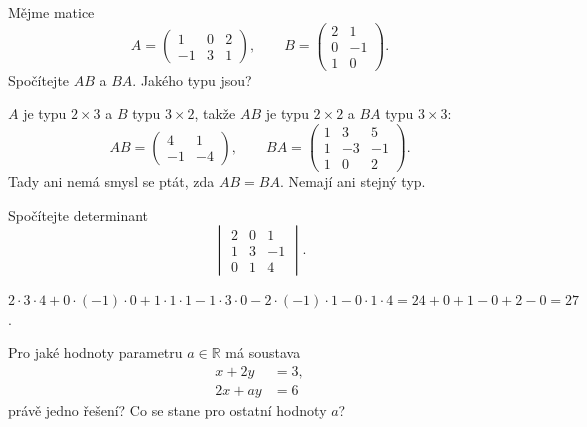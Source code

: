 \begin{problem}
  Mějme matice
  \begin{equation*}
    A = \begin{pmatrix} 1 & 0 & 2\\ -1 & 3 & 1 \end{pmatrix},\qquad B = \begin{pmatrix} 2 & 1\\ 0 & -1\\ 1 & 0 \end{pmatrix}.
  \end{equation*}
  Spočítejte $AB$ a $BA$. Jakého typu jsou?
\end{problem}

\begin{solution}
  $A$ je typu $2\times 3$ a $B$ typu $3\times 2$, takže $AB$ je typu $2\times 2$ a $BA$ typu $3\times 3$:
  \begin{equation*}
    AB = \begin{pmatrix} 4 & 1\\ -1 & -4 \end{pmatrix},\qquad
    BA = \begin{pmatrix} 1 & 3 & 5\\ 1 & -3 & -1\\ 1 & 0 & 2 \end{pmatrix}.
  \end{equation*}
  Tady ani nemá smysl se ptát, zda $AB = BA$. Nemají ani stejný typ.
\end{solution}

\begin{problem}
  Spočítejte determinant
  \begin{equation*}
    \begin{vmatrix} 2 & 0 & 1\\ 1 & 3 & -1\\ 0 & 1 & 4 \end{vmatrix}.
  \end{equation*}
\end{problem}

\begin{solution}
  $2\cdot 3\cdot 4 + 0\cdot(-1)\cdot 0 + 1\cdot 1\cdot 1 - 1\cdot 3\cdot 0 - 2\cdot(-1)\cdot 1 - 0\cdot 1\cdot 4 = 24 + 0 + 1 - 0 + 2 - 0 = 27$.
\end{solution}

\begin{problem}
  Pro jaké hodnoty parametru $a\in\mathbb{R}$ má soustava
  \begin{align*}
    x + 2y &= 3,\\
    2x + ay &= 6
  \end{align*}
  právě jedno řešení? Co se stane pro ostatní hodnoty $a$?
\end{problem}

